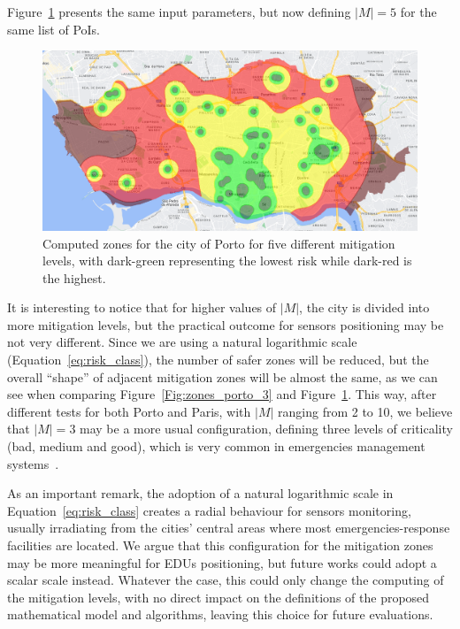 \begin{refsection}
Figure~\ref{Fig:zones_porto_5} presents the same input parameters, but now defining $|M|=5$ for the same list of PoIs.

\begin{figure}[ht!]
  \centering
  \includegraphics[width=0.9\linewidth]{Chapters/3-EDUs/images/porto_M5_no_weight.png}
  \caption{Computed zones for the city of Porto for five different mitigation levels, with dark-green representing the lowest risk while dark-red is the highest.}\label{Fig:zones_porto_5}
\end{figure}

It is interesting to notice that for higher values of $|M|$, the city is divided into more mitigation levels, but the practical outcome for sensors positioning may be not very different. Since we are using a natural logarithmic scale (Equation~\ref{eq:risk_class}), the number of safer zones will be reduced, but the overall ``shape'' of adjacent mitigation zones will be almost the same, as we can see when comparing Figure~\ref{Fig:zones_porto_3} and Figure~\ref{Fig:zones_porto_5}. This way, after different tests for both Porto and Paris, with $|M|$ ranging from 2 to 10, we believe that $|M|=3$ may be a more usual configuration, defining three levels of criticality (bad, medium and good), which is very common in emergencies management systems~\cite{surveyEmergencies}.

As an important remark, the adoption of a natural logarithmic scale in Equation~\ref{eq:risk_class} creates a radial behaviour for sensors monitoring, usually irradiating from the cities' central areas where most emergencies-response facilities are located. We argue that this configuration for the mitigation zones may be more meaningful for EDUs positioning, but future works could adopt a scalar scale instead. Whatever the case, this could only change the computing of the mitigation levels, with no direct impact on the definitions of the proposed mathematical model and algorithms, leaving this choice for future evaluations.


\end{refsection}
